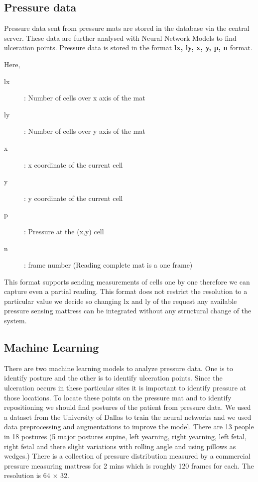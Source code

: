 \subsection{Pressure data}

Pressure data sent from pressure mats are stored in the database via the central server. These data are further analysed with Neural Network Models to find ulceration points. Pressure data is stored in the format \textbf{lx, ly, x, y, p, n} format. 

Here,

\begin{description}
	\item[lx]: Number of cells over x axis of the mat 
	\item[ly]: Number of cells over y axis of the mat 
	\item[x]: x coordinate of the current cell 
	\item[y]: y coordinate of the current cell  
	\item[p]: Pressure at the (x,y) cell
	\item[n]: frame number (Reading complete mat is a one frame)  
\end{description}

This format supports sending measurements of cells one by one therefore we can capture even a partial reading. This format does not restrict the resolution to a particular value we decide so changing lx and ly of the request any available pressure sensing mattress can be integrated without any structural change of the system. 

\subsection{Machine Learning}

There are two machine learning models to analyze pressure data. One is to identify posture and the other is to identify ulceration points. Since the ulceration occurs in these particular sites it is important to identify pressure at those locations. To locate these points on the pressure mat and to identify repositioning we should find postures of the patient from pressure data. 
We used a dataset from the University of Dallas to train the neural networks and we used data preprocessing and augmentations to improve the model. There are 13 people in 18 postures (5 major postures supine, left yearning, right yearning, left fetal, right fetal and there slight variations with rolling angle and using pillows as wedges.) There is a collection of pressure distribution measured by a commercial pressure measuring mattress for 2 mins which is roughly 120 frames for each. The resolution is 64 $\times$ 32.

